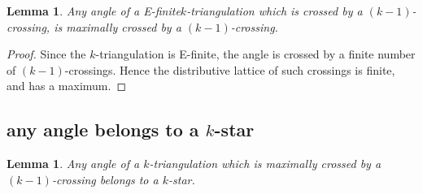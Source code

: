 \documentclass{amsart}
\newtheorem{lemma}[theorem]{Lemma}
\theoremstyle{remark}
\newcommand*{\ef}[0]{E-finite\xspace}
\newcommand*{\ktg}[0]{$k$-triangulation\xspace}
\begin{document}
\begin{lemma}
Any angle of a \ef \ktg which is crossed by a $(k-1)$-crossing, is maximally crossed by a $(k-1)$-crossing.
\end{lemma}
\begin{proof}
Since the \ktg is \ef, the angle is crossed by a finite number of $(k-1)$-crossings. Hence the distributive lattice of such crossings is finite, and has a maximum.
\end{proof}

\subsection{any angle belongs to a $k$-star}

\begin{lemma}
Any angle of a \ktg which is maximally crossed by a $(k-1)$-crossing belongs to a $k$-star.
\end{lemma}
\end{document}
